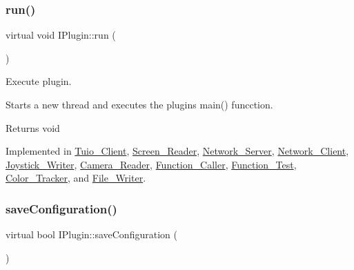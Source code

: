 \mbox{\label{class_i_plugin_a46b4ace767e77f9db9c9585e99c09039}} 
\subsubsection{\texorpdfstring{run()}{run()}}
{\footnotesize\ttfamily virtual void I\+Plugin\+::run (\begin{DoxyParamCaption}{ }\end{DoxyParamCaption})\hspace{0.3cm}{\ttfamily [pure virtual]}}



Execute plugin. 

Starts a new thread and executes the plugins main() funcction. \begin{DoxyReturn}{Returns}
void 
\end{DoxyReturn}


Implemented in \hyperlink{class_tuio___client_ae326548bc87892e62dbe5f0a5a8b27cc}{Tuio\+\_\+\+Client}, \hyperlink{class_screen___reader_a9c716b5a3b6f94e1cf89eee7823ecd60}{Screen\+\_\+\+Reader}, \hyperlink{class_network___server_ac8778efb5b94041cafa3e57d57e8d9a2}{Network\+\_\+\+Server}, \hyperlink{class_network___client_a8831a63a0892de0f975e61b3d68473c7}{Network\+\_\+\+Client}, \hyperlink{class_joystick___writer_aa1ab2778180c281887758883622b78bf}{Joystick\+\_\+\+Writer}, \hyperlink{class_camera___reader_a3192d04dc33c238d6f779a72ffc08a5e}{Camera\+\_\+\+Reader}, \hyperlink{class_function___caller_a508165a2fab0cb3f77d89135994f342d}{Function\+\_\+\+Caller}, \hyperlink{class_function___test_ae9c552f668d5f2dad706677908d9e623}{Function\+\_\+\+Test}, \hyperlink{class_color___tracker_a77d5ddbb266c0a13963fae15285ccc37}{Color\+\_\+\+Tracker}, and \hyperlink{class_file___writer_a3a7de57b86f801257806115b54136fd7}{File\+\_\+\+Writer}.

\mbox{\label{class_i_plugin_a79b5c42b1c7b08257a6110b2091039bc}} 
\subsubsection{\texorpdfstring{save\+Configuration()}{saveConfiguration()}}
{\footnotesize\ttfamily virtual bool I\+Plugin\+::save\+Configuration (\begin{DoxyParamCaption}{ }\end{DoxyParamCaption})\hspace{0.3cm}{\ttfamily [pure virtual]}}



